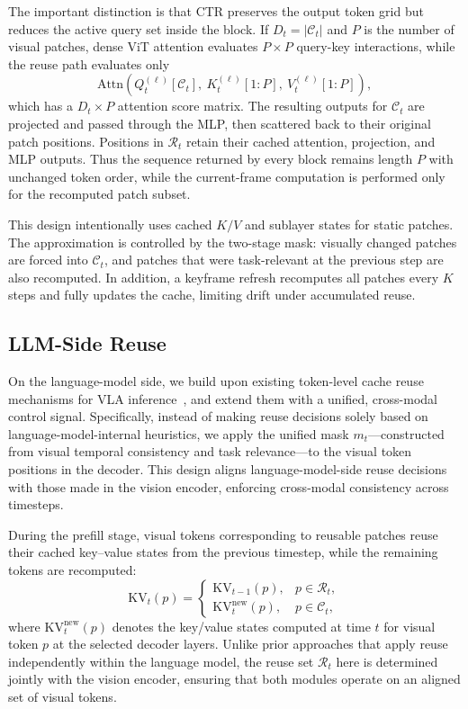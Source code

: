 \documentclass[11pt]{article}
\begin{document}
The important distinction is that CTR preserves the output token grid but reduces the active query set inside the block. If $D_t=|\mathcal{C}_t|$ and $P$ is the number of visual patches, dense ViT attention evaluates $P \times P$ query-key interactions, while the reuse path evaluates only
\begin{equation}
    \mathrm{Attn}\!\left(Q_t^{(\ell)}[\mathcal{C}_t],\ K_t^{(\ell)}[1{:}P],\ V_t^{(\ell)}[1{:}P]\right),
    \label{eq:ve_partial_query}
\end{equation}
which has a $D_t \times P$ attention score matrix. The resulting outputs for $\mathcal{C}_t$ are projected and passed through the MLP, then scattered back to their original patch positions. Positions in $\mathcal{R}_t$ retain their cached attention, projection, and MLP outputs. Thus the sequence returned by every block remains length $P$ with unchanged token order, while the current-frame computation is performed only for the recomputed patch subset.

This design intentionally uses cached $K/V$ and sublayer states for static patches. The approximation is controlled by the two-stage mask: visually changed patches are forced into $\mathcal{C}_t$, and patches that were task-relevant at the previous step are also recomputed. In addition, a keyframe refresh recomputes all patches every $K$ steps and fully updates the cache, limiting drift under accumulated reuse.

\subsection{LLM-Side Reuse}

On the language-model side, we build upon existing token-level cache reuse mechanisms for VLA inference~\citep{xu2025vla}, and extend them with a unified, cross-modal control signal.
Specifically, instead of making reuse decisions solely based on language-model-internal heuristics, we apply the unified mask $m_t$—constructed from visual temporal consistency and task relevance—to the visual token positions in the decoder.
This design aligns language-model-side reuse decisions with those made in the vision encoder, enforcing cross-modal consistency across timesteps.

During the prefill stage, visual tokens corresponding to reusable patches reuse their cached key--value states from the previous timestep, while the remaining tokens are recomputed:
\begin{equation}
    \mathrm{KV}_t(p)=
    \begin{cases}
    \mathrm{KV}_{t-1}(p), & p \in \mathcal{R}_t,\\
    \mathrm{KV}_t^{\text{new}}(p), & p \in \mathcal{C}_t,
    \end{cases}
    \label{eq:llm_reuse}
\end{equation}
where $\mathrm{KV}_t^{\text{new}}(p)$ denotes the key/value states computed at time $t$ for visual token $p$ at the selected decoder layers.
Unlike prior approaches that apply reuse independently within the language model, the reuse set $\mathcal{R}_t$ here is determined jointly with the vision encoder, ensuring that both modules operate on an aligned set of visual tokens.
\end{document}

